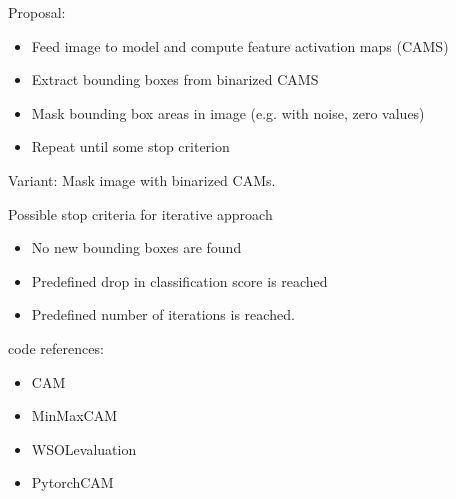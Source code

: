Proposal:
\begin{itemize}
    \item Feed image to model and compute feature activation maps (CAMS)
    \item Extract bounding boxes from binarized CAMS
    \item Mask bounding box areas in image (e.g. with noise, zero values)
    \item Repeat until some stop criterion
\end{itemize}
Variant: Mask image with binarized CAMs.

Possible stop criteria for iterative approach
\begin{itemize}
    \item No new bounding boxes are found
    \item Predefined drop in classification score is reached
    \item Predefined number of iterations is reached.
\end{itemize}

code references:
\begin{itemize}
    \item CAM \cite{code:CAM}
    \item MinMaxCAM \cite{code:MinMaxCAM}
    \item WSOLevaluation\cite{code:WSOLevaluation}
    \item PytorchCAM \cite{code:PytorchCAM}
\end{itemize}